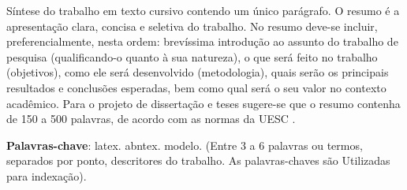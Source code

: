 %
%


\begin{center}
\imprimirtitulo
\end{center}

\begin{resumo}
Síntese do trabalho em texto cursivo contendo um único parágrafo. O resumo é a apresentação clara, concisa e seletiva do trabalho.
No resumo deve-se incluir, preferencialmente, nesta ordem: brevíssima introdução ao assunto do trabalho de pesquisa (qualificando-o quanto à sua natureza), o que será feito no trabalho (objetivos), como ele será desenvolvido (metodologia), quais serão os principais resultados e conclusões esperadas, bem como qual será o seu valor no contexto acadêmico. Para o projeto de dissertação e teses sugere-se que o resumo contenha de 150 a 500 palavras, de acordo com as normas da UESC \cite{normasuesc}.

\textbf{Palavras-chave}: latex. abntex. modelo.
 (Entre 3 a 6 palavras ou termos, separados por ponto, descritores do trabalho. As palavras-chaves são Utilizadas para indexação).

\end{resumo}
